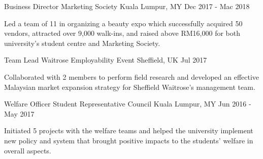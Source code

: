 

\begin{cventries}

  \cventry
    {Business Director} %
    {Marketing Society} %
    {Kuala Lumpur, MY} %
    {Dec 2017 - Mac 2018} %
    {
      \begin{cvitems} %
        \item {Led a team of 11 in organizing a beauty expo which successfully acquired 50 vendors, attracted over 9,000 walk-ins, and raised above RM16,000 for both university’s student centre and Marketing Society.}
      \end{cvitems}
    }

  \cventry
    {Team Lead} %
    {Waitrose Employability Event} %
    {Sheffield, UK} %
    {Jul 2017} %
    {
      \begin{cvitems} %
        \item {Collaborated with 2 members to perform field research and developed an effective Malaysian market expansion strategy for Sheffield Waitrose’s management team.}
      \end{cvitems}
    }

  \cventry
    {Welfare Officer} %
    {Student Representative Council} %
    {Kuala Lumpur, MY} %
    {Jun 2016 - May 2017} %
    {
      \begin{cvitems} %
        \item {Initiated 5 projects with the welfare teams and helped the university implement new policy and system that brought positive impacts to the students’ welfare in overall aspects.}
      \end{cvitems}
    }

\end{cventries}
